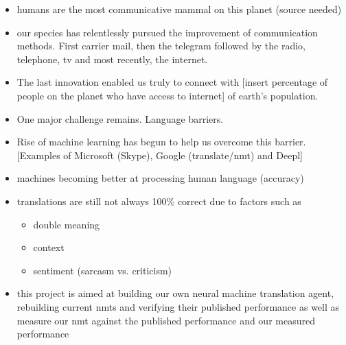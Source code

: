 \documentclass[10pt,a4paper,titlepage,twoside,english]{zhawreprt}
\begin{document}
\begin{itemize}
	\item humans are the most communicative mammal on this planet (source needed)
	\item our species has relentlessly pursued the improvement of communication methods. First carrier mail, then the telegram followed by the radio, telephone, tv and most recently, the internet.
	\item The last innovation enabled us truly to connect with [insert percentage of people on the planet who have access to internet] of earth's population.
	\item One major challenge remains. Language barriers.
	\item Rise of machine learning has begun to help us overcome this barrier. [Examples of Microsoft (Skype), Google (translate/nmt) and Deepl]
	\item machines becoming better at processing human language (accuracy)
	\item translations are still not always 100\% correct due to factors such as
	\begin{itemize}
		\item double meaning
		\item context
		\item sentiment (sarcasm vs. criticism)
	\end{itemize}
	\item this project is aimed at building our own neural machine translation agent, rebuilding current nmts and verifying their published performance as well as measure our nmt against the published performance and our measured performance
\end{itemize}
\end{document}
